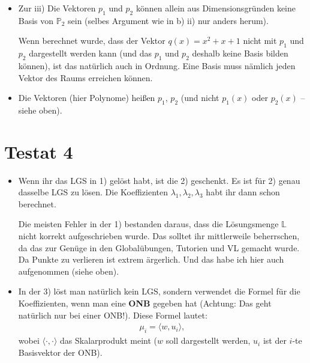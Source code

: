 \documentclass[11pt, a4paper]{article}
\newcommand{\Lsg}{\mathbb{L}}
\newcommand{\Poly}{\mathbb{P}}
\begin{document}
\begin{itemize}
\item Zur iii) Die Vektoren $p_1$ und $p_2$ können allein aus Dimensionsgründen keine Basis von $\Poly_2$ sein (selbes Argument wie in b) ii) nur anders herum).

Wenn berechnet wurde, dass der Vektor $q(x) = x^2 + x + 1$ nicht mit $p_1$ und $p_2$ dargestellt werden kann (und das $p_1$ und $p_2$ deshalb keine Basis bilden können), ist das natürlich auch in Ordnung. Eine Basis muss nämlich jeden Vektor des Raums erreichen können.

\item Die Vektoren (hier Polynome) heißen $p_1$, $p_2$ (und nicht $p_1(x)$ oder $p_2(x)$ -- siehe oben).
\end{itemize}







\newpage
\section*{Testat 4}
\begin{itemize}
\item Wenn ihr das LGS in 1) gelöst habt, ist die 2) geschenkt. Es ist für 2) genau dasselbe LGS zu lösen. Die Koeffizienten $\lambda_1, \lambda_2, \lambda_3$ habt ihr dann schon berechnet.

Die meisten Fehler in der 1) bestanden daraus, dass die Lösungsmenge $\Lsg$ nicht korrekt aufgeschrieben wurde. Das solltet ihr mittlerweile beherrschen, da das zur Genüge in den Globalübungen, Tutorien und VL gemacht wurde. Da Punkte zu verlieren ist extrem ärgerlich. Und das habe ich hier auch aufgenommen (siehe oben).

\item In der 3) löst man natürlich kein LGS, sondern verwendet die Formel für die Koeffizienten, wenn man eine \textbf{ONB} gegeben hat (Achtung: Das geht natürlich nur bei einer ONB!). Diese Formel lautet:
\begin{align*}
\mu_i = \langle w, u_i \rangle,
\end{align*}
wobei $\langle \cdot, \cdot \rangle$ das Skalarprodukt meint ($w$ soll dargestellt werden, $u_i$ ist der $i$-te Basisvektor der ONB).

\end{itemize}





\newpage
\end{document}
